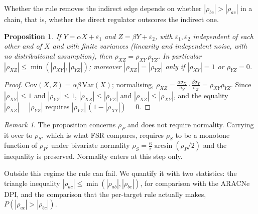 \documentclass[11pt,a4paper]{article}
\theoremstyle{plain}
\newtheorem{proposition}{Proposition}
\theoremstyle{remark}
\newtheorem{remark}{Remark}
\newcommand{\rhoS}{\rho_{S}}
\newcommand{\rhoP}{\rho_{P}}
\newcommand{\FSR}{FSR}
\begin{document}
Whether the rule removes the indirect edge depends on whether $|\rho_{bc}|>|\rho_{ac}|$ in a
chain, that is, whether the direct regulator outscores the indirect one.

\begin{proposition}
If $Y=\alpha X+\varepsilon_1$ and $Z=\beta Y+\varepsilon_2$, with $\varepsilon_1,\varepsilon_2$
independent of each other and of $X$ and with finite variances (linearity and independent noise, with no distributional
assumption), then $\rho_{XZ}=\rho_{XY}\,\rho_{YZ}$. In particular $|\rho_{XZ}|\le\min(|\rho_{XY}|,|\rho_{YZ}|)$;
moreover $|\rho_{XZ}|=|\rho_{YZ}|$ only if $|\rho_{XY}|=1$ or $\rho_{YZ}=0$.
\end{proposition}
\begin{proof}
$\mathrm{Cov}(X,Z)=\alpha\beta\,\mathrm{Var}(X)$; normalising,
$\rho_{XZ}=\frac{\alpha\sigma_X}{\sigma_Y}\cdot\frac{\beta\sigma_Y}{\sigma_Z}=\rho_{XY}\rho_{YZ}$.
Since $|\rho_{XY}|\le1$ and $|\rho_{YZ}|\le1$, $|\rho_{XZ}|\le|\rho_{YZ}|$ and $|\rho_{XZ}|\le|\rho_{XY}|$, and the
equality $|\rho_{XZ}|=|\rho_{YZ}|$ requires $|\rho_{YZ}|\,(1-|\rho_{XY}|)=0$.
\end{proof}
\begin{remark}
The proposition concerns $\rhoP$ and does not require normality. Carrying it over to $\rhoS$,
which is what \FSR{} compares, requires $\rhoS$ to be a monotone function of $\rhoP$; under
bivariate normality $\rhoS=\tfrac{6}{\pi}\arcsin(\rhoP/2)$ and the inequality is preserved.
Normality enters at this step only.
\end{remark}
Outside this regime the rule can fail. We quantify it with two statistics: the triangle
inequality $|\rho_{ac}|\le\min(|\rho_{ab}|,|\rho_{bc}|)$, for comparison with the ARACNe DPI,
and the comparison that the per-target rule actually makes, $P(|\rho_{ac}|>|\rho_{bc}|)$.
\end{document}
